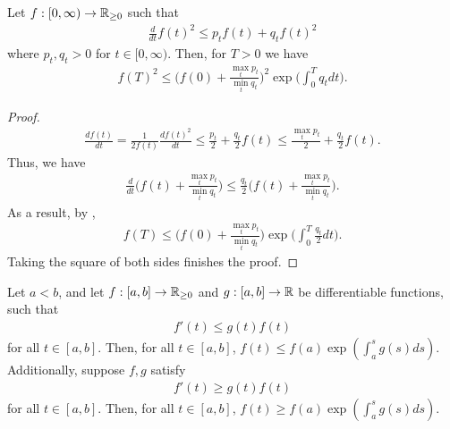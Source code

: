 \begin{lemma}\label{lemma:integral_bound}
Let $f: [0, \infty) \to \mathbb{R}_{\geq 0}$ such that
\begin{align}
\frac{d}{dt} f(t)^2 \leq p_t f(t) + q_t f(t)^2
\end{align}
where $p_t, q_t > 0$ for $t \in [0, \infty)$. Then, for $T>0$ we have
	\begin{align}
		f(T)^2 \le \Big(f(0) + \frac{\max_tp_t}{\min_t q_t }\Big)^2 \exp\Big(\int_{0}^T q_tdt\Big).
	\end{align}
\end{lemma}
\begin{proof}
	\begin{align}
		\frac{d f(t)}{dt} = \frac{1}{2f(t)} \frac{d f(t)^2}{dt} \le \frac{p_t}{2} + \frac{q_t}{2} f(t) \le \frac{\max_t p_t}{2} + \frac{q_t}{2} f(t).
	\end{align}
	Thus, we have
	\begin{align}
		\frac{d}{dt} \Big(f(t)+\frac{\max_t p_t}{\min_t q_t}\Big) \le \frac{q_t}{2} \Big(f(t) + \frac{\max_t p_t}{\min_t q_t}\Big).
	\end{align} 
	As a result, by ,
	\begin{align}
		f(T) \le \Big(f(0) + \frac{\max_t p_t}{\min_t q_t}\Big) \exp\Big(\int_{0}^T \frac{q_t}{2}dt\Big).
	\end{align}
	Taking the square of both sides finishes the proof.
\end{proof}

\begin{fact} \label{fact:gronwall}
Let $a < b$, and let $f: [a, b] \to \mathbb{R}_{\geq 0}$ and $g: [a, b] \to \mathbb{R}$ be differentiable functions, such that
\begin{align}
f'(t) \leq g(t) f(t)
\end{align}
for all $t \in [a, b]$. Then, for all $t \in [a, b]$, $f(t) \leq f(a) \exp(\int_a^s g(s) ds)$. Additionally, suppose $f, g$ satisfy
\begin{align}
f'(t) \geq g(t) f(t)
\end{align}
for all $t \in [a, b]$. Then, for all $t \in [a, b]$, $f(t) \geq f(a) \exp(\int_a^s g(s) ds)$.
\end{fact}

